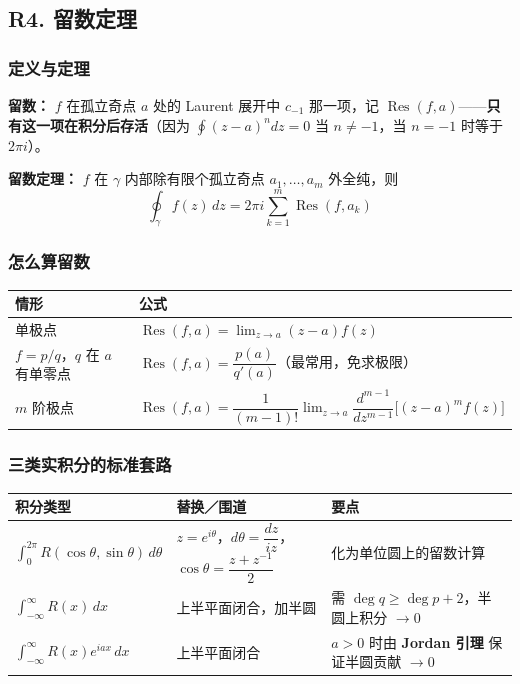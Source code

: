 \subsection{R4. 留数定理}

\subsubsection{定义与定理}

\textbf{留数：} $f$ 在孤立奇点 $a$ 处的 Laurent 展开中 $c_{-1}$ 那一项，记 $\operatorname{Res}(f,a)$——\textbf{只有这一项在积分后存活}（因为 $\oint(z-a)^n dz=0$ 当 $n\ne-1$，当 $n=-1$ 时等于 $2\pi i$）。

\textbf{留数定理：} $f$ 在 $\gamma$ 内部除有限个孤立奇点 $a_1,\dots,a_m$ 外全纯，则
\[
\boxed{\ \oint_\gamma f(z)\,dz=2\pi i\sum_{k=1}^m\operatorname{Res}(f,a_k)\ }
\]

\subsubsection{怎么算留数}

\begin{center}
\begin{tabular}{L{3.4cm}L{9.4cm}}
\toprule
\textbf{情形} & \textbf{公式} \\
\midrule
单极点 & $\operatorname{Res}(f,a)=\lim_{z\to a}(z-a)f(z)$ \\
$f=p/q$，$q$ 在 $a$ 有单零点 & $\operatorname{Res}(f,a)=\dfrac{p(a)}{q'(a)}$（最常用，免求极限） \\
$m$ 阶极点 & $\operatorname{Res}(f,a)=\dfrac{1}{(m-1)!}\lim_{z\to a}\dfrac{d^{m-1}}{dz^{m-1}}\big[(z-a)^mf(z)\big]$ \\
\bottomrule
\end{tabular}
\end{center}

\subsubsection{三类实积分的标准套路}

\begin{center}
\begin{tabular}{L{4.6cm}L{4.6cm}L{4.8cm}}
\toprule
\textbf{积分类型} & \textbf{替换／围道} & \textbf{要点} \\
\midrule
$\displaystyle\int_0^{2\pi}R(\cos\theta,\sin\theta)\,d\theta$ &
$z=e^{i\theta}$，$d\theta=\dfrac{dz}{iz}$，$\cos\theta=\dfrac{z+z^{-1}}{2}$ &
化为单位圆上的留数计算 \\
\addlinespace
$\displaystyle\int_{-\infty}^{\infty}R(x)\,dx$ &
上半平面闭合，加半圆 & 需 $\deg q\ge\deg p+2$，半圆上积分 $\to0$ \\
\addlinespace
$\displaystyle\int_{-\infty}^{\infty}R(x)e^{iax}\,dx$ &
上半平面闭合 & $a>0$ 时由 \textbf{Jordan 引理} 保证半圆贡献 $\to0$ \\
\bottomrule
\end{tabular}
\end{center}

